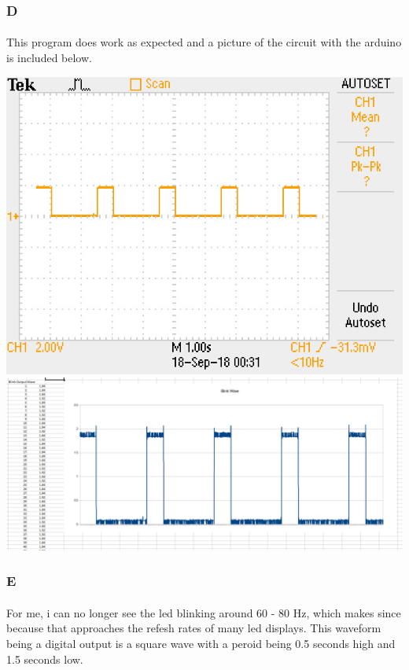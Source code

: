 \documentclass[12pt]{article}
\begin{document}
			\subsubsection{D}
				\paragraph{}
					This program does work as expected and a picture of the circuit with the arduino is included below.
				
					\begin{center}
						\includegraphics[scale=0.6]{oblink.jpg}\\
						\vspace{1cm}
						\includegraphics[scale=0.15]{eblink.png}\\
					\end{center}

			\subsubsection{E}
				\paragraph{}
					For me, i can no longer see the led blinking around 60 - 80 Hz, which makes since because that approaches the refesh rates
					of many led displays.  This waveform being a digital output is a square wave with a peroid being 0.5 seconds high and 1.5
					seconds low.
\end{document}
